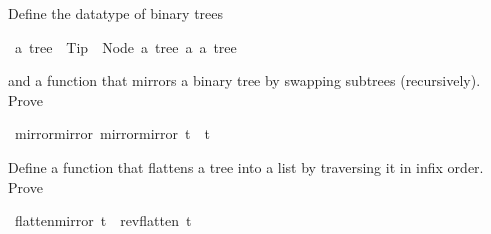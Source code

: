 %
\begin{isabellebody}%
%
\begin{isamarkuptext}%
\noindent
Define the datatype of binary trees%
\end{isamarkuptext}%
\ {\isacharprime}a\ tree\ {\isacharequal}\ Tip\ {\isacharbar}\ Node\ {\isachardoublequote}{\isacharprime}a\ tree{\isachardoublequote}\ {\isacharprime}a\ {\isachardoublequote}{\isacharprime}a\ tree{\isachardoublequote}%
\begin{isamarkuptext}%
\noindent
and a function  that mirrors a binary tree
by swapping subtrees (recursively). Prove%
\end{isamarkuptext}%
\ mirror{\isacharunderscore}mirror{\isacharcolon}\ {\isachardoublequote}mirror{\isacharparenleft}mirror\ t{\isacharparenright}\ {\isacharequal}\ t{\isachardoublequote}%
\begin{isamarkuptext}%
\noindent
Define a function  that flattens a tree into a list
by traversing it in infix order. Prove%
\end{isamarkuptext}%
\ {\isachardoublequote}flatten{\isacharparenleft}mirror\ t{\isacharparenright}\ {\isacharequal}\ rev{\isacharparenleft}flatten\ t{\isacharparenright}{\isachardoublequote}\end{isabellebody}%
